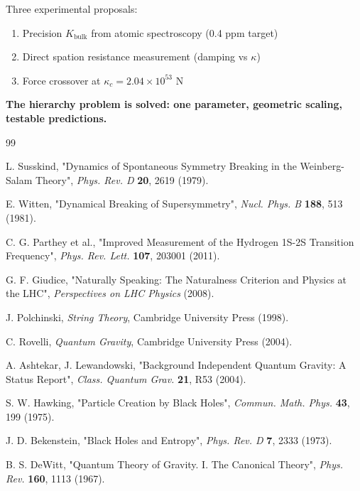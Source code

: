 Three experimental proposals:
\begin{enumerate}
\item Precision $K_{\text{bulk}}$ from atomic spectroscopy (0.4 ppm target)
\item Direct spation resistance measurement (damping vs $\kappa$)
\item Force crossover at $\kappa_c = 2.04 \times 10^{53}$ N
\end{enumerate}

\textbf{The hierarchy problem is solved: one parameter, geometric scaling, testable predictions.}




\begin{thebibliography}{99}

L. Susskind, "Dynamics of Spontaneous Symmetry Breaking in the Weinberg-Salam Theory", \emph{Phys. Rev. D} \textbf{20}, 2619 (1979).

E. Witten, "Dynamical Breaking of Supersymmetry", \emph{Nucl. Phys. B} \textbf{188}, 513 (1981).

C. G. Parthey et al., "Improved Measurement of the Hydrogen 1S-2S Transition Frequency", \emph{Phys. Rev. Lett.} \textbf{107}, 203001 (2011).

G. F. Giudice, "Naturally Speaking: The Naturalness Criterion and Physics at the LHC", \emph{Perspectives on LHC Physics} (2008).

J. Polchinski, \emph{String Theory}, Cambridge University Press (1998).

C. Rovelli, \emph{Quantum Gravity}, Cambridge University Press (2004).

A. Ashtekar, J. Lewandowski, "Background Independent Quantum Gravity: A Status Report", \emph{Class. Quantum Grav.} \textbf{21}, R53 (2004).

S. W. Hawking, "Particle Creation by Black Holes", \emph{Commun. Math. Phys.} \textbf{43}, 199 (1975).

J. D. Bekenstein, "Black Holes and Entropy", \emph{Phys. Rev. D} \textbf{7}, 2333 (1973).

B. S. DeWitt, "Quantum Theory of Gravity. I. The Canonical Theory", \emph{Phys. Rev.} \textbf{160}, 1113 (1967).

\end{thebibliography}



